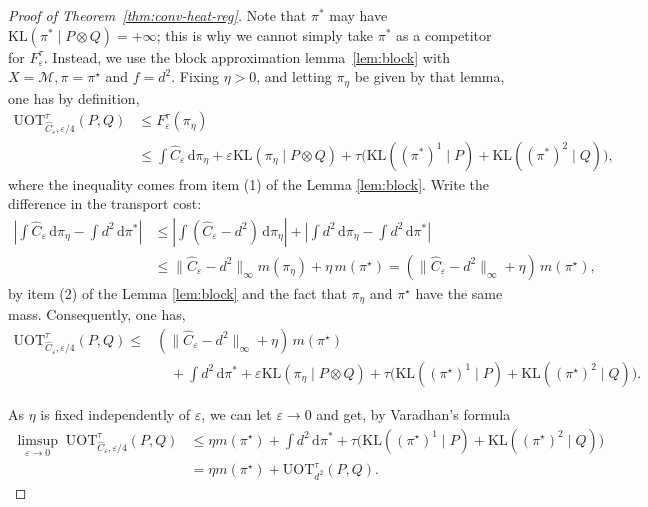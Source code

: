 \documentclass{article}
\theoremstyle{plain}
\theoremstyle{definition}
\theoremstyle{remark}
\newcommand{\M}{\ensuremath{\mathcal{M}}}
\begin{document}
\begin{proof}[Proof of Theorem~\ref{thm:conv-heat-reg}]
Note that $\pi^*$ may have $\mathrm{KL}(\pi^* \mid P \otimes Q) = +\infty$; this is why we cannot simply take $\pi^*$ as a competitor for $F^{\tau}_\varepsilon$. Instead, we use the block approximation lemma~\ref{lem:block} with $X = \M, \pi = \pi^\star$ and $f=d^2$. Fixing $\eta > 0$, and letting $\pi_\eta$ be given by that lemma, one has by definition,
\begin{align*}
\mathrm{UOT}^{\tau}_{\widehat{C}_\varepsilon, \varepsilon/4}(P,Q) &\le F^{\tau}_\varepsilon(\pi_{\eta}) 
 \\
&\le \int \widehat{C}_\varepsilon\, \mathrm{d}\pi_{\eta} + \varepsilon \mathrm{KL}(\pi_{\eta}\mid P\otimes Q)
+ \tau\bigl(\mathrm{KL}((\pi^{*})^1\mid P) + \mathrm{KL}((\pi^{*})^2\mid Q)\bigr),
\end{align*}
where the inequality comes from item (1) of the Lemma \ref{lem:block}.
Write the difference in the transport cost:
\begin{align*}
\left|\int \widehat{C}_\varepsilon\, \mathrm{d}\pi_{\eta} - \int d^2\, \mathrm{d}\pi^*\right|
&\le \left|\int (\widehat{C}_\varepsilon - d^2)\, \mathrm{d}\pi_{\eta}\right| + \left|\int d^2\, \mathrm{d}\pi_{\eta} - \int d^2\, \mathrm{d}\pi^*\right| \\
&\le \|\widehat{C}_\varepsilon - d^2\|_\infty m(\pi_\eta) + \eta\, m(\pi^\star) = (\|\widehat{C}_\varepsilon - d^2\|_\infty + \eta) \, m(\pi^\star),
\end{align*}
by item (2) of the Lemma \ref{lem:block} and the fact that $\pi_\eta$ and $\pi^\star$ have the same mass. Consequently, one has, 
\begin{align*}
\mathrm{UOT}^{\tau}_{\widehat{C}_\varepsilon, \varepsilon/4}(P,Q)  \le & (\|\widehat{C}_\varepsilon - d^2\|_\infty + \eta) \, m(\pi^{\star}) \\
& \quad + \int d^2\, \mathrm{d}\pi^* + \varepsilon \mathrm{KL}(\pi_{\eta}\mid P\otimes Q)
+ \tau\bigl(\mathrm{KL}((\pi^{\star})^1\mid P) + \mathrm{KL}((\pi^{\star})^2\mid Q)\bigr). 
\end{align*}

As $\eta$ is fixed independently of $\varepsilon$, we can let $\varepsilon \to 0$ and get, by Varadhan's formula
\begin{align*}
\limsup_{\varepsilon \to 0}\; \mathrm{UOT}^{\tau}_{\widehat{C}_\varepsilon, \varepsilon/4}(P,Q) 
&\le \eta m(\pi^{\star}) + \int d^2\, \mathrm{d}\pi^* +\tau\bigl(\mathrm{KL}((\pi^{\star})^1\mid P) + \mathrm{KL}((\pi^{\star})^2\mid Q)\bigr) \\
&= \eta m(\pi^{\star}) + \mathrm{UOT}^{\tau}_{d^2}(P,Q).
\end{align*}


\end{proof}
\end{document}
